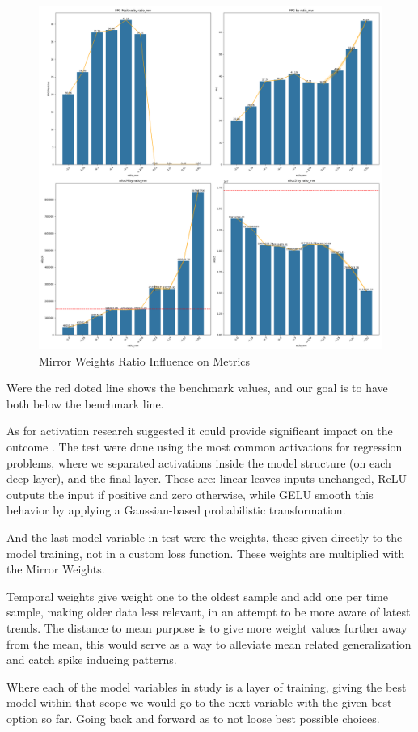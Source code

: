 \begin{figure}[H]
    \centering
    \includegraphics[width=\textwidth]{plots/article_ratio_mw.png}
    \caption{Mirror Weights Ratio Influence on Metrics}
    \label{fig:Ratio_influence_on_metrics}
  \end{figure}
Were the red doted line shows the benchmark values, and our goal is to have both below the benchmark line.\par
As for activation research suggested it could  provide significant impact on the outcome \cite{Vaswani2017,Liu2022}. The test were done using the most common activations for regression problems, where we separated activations inside the model structure (on each deep layer), and the final layer. These are: linear leaves inputs unchanged, \gls{ReLU} outputs the input if positive and zero otherwise, while \gls{GELU} smooth this behavior by applying a Gaussian-based probabilistic transformation. \par
And the last model variable in test were the weights, these given directly to the model training, not in a custom loss function. These weights are multiplied with the Mirror Weights.\par
Temporal weights give weight one to the oldest sample and add one per time sample, making older data less relevant, in an attempt to be more aware of latest trends. The distance to mean purpose is to give more weight values further away from the mean, this would serve as a way to alleviate mean related generalization and catch spike inducing patterns.\par
Where each of the model variables in study is a layer of training, giving the best model within that scope we would go to the next variable with the given best option so far. Going back and forward as to not loose best possible choices.\par


